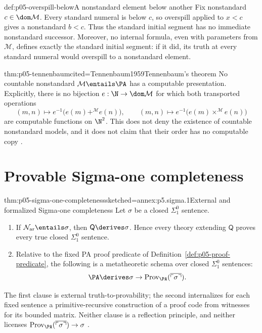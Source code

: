 \begin{hbexample}{def:p05-overspill-below}{A nonstandard element below another}
Fix nonstandard \(c\in\dom\mathcal M\).  Every standard numeral is below
\(c\), so overspill applied to \(x<c\) gives a nonstandard \(b<c\).
Thus the standard initial segment has no immediate nonstandard successor.
Moreover, no internal formula, even with parameters from \(\mathcal M\),
defines exactly the standard initial segment: if it did, its truth at every
standard numeral would overspill to a nonstandard element.
\end{hbexample}

\begin{hbtheorem}{thm:p05-tennenbaum}{cited=Tennenbaum1959}{Tennenbaum's theorem}
No countable nonstandard \(\mathcal M\entails\PA\) has a computable
presentation.  Explicitly, there is no bijection
\(e:\N\to\dom\mathcal M\) for which both transported operations
\[
  (m,n)\longmapsto e^{-1}\!\bigl(e(m)+^{\mathcal M}e(n)\bigr),\qquad
  (m,n)\longmapsto e^{-1}\!\bigl(e(m)\times^{\mathcal M}e(n)\bigr)
\]
are computable functions on \(\N^2\).  This does not deny the existence
of countable nonstandard models, and it does not claim that their order
has no computable copy \cite{Kaye1991}.
\end{hbtheorem}

\section{Provable Sigma-one completeness}

\begin{hbtheorem}{thm:p05-sigma-one-completeness}{sketched=annex:p5.sigma.1}{External and formalized Sigma-one completeness}
Let \(\sigma\) be a closed \(\Sigma^0_1\) sentence.
\begin{enumerate}
  \item If \(\mathcal N_{\mathrm{ar}}\entails\sigma\), then
        \(\mathsf Q\derives\sigma\).  Hence every theory extending
        \(\mathsf Q\) proves every true closed \(\Sigma^0_1\) sentence.
  \item Relative to the fixed PA proof predicate of
        Definition~\ref{def:p05-proof-predicate}, the following is a
        metatheoretic schema over closed \(\Sigma^0_1\) sentences:
        \[
          \PA\derives
          \sigma\to
          \mathrm{Prov}_{\PA}(\overline{\ulcorner\sigma\urcorner}).
        \]
\end{enumerate}
The first clause is external truth-to-provability; the second internalizes
for each fixed sentence a primitive-recursive construction of a proof code
from witnesses for its bounded matrix.  Neither clause is a reflection
principle, and neither licenses
\(\mathrm{Prov}_{\PA}(\overline{\ulcorner\sigma\urcorner})\to\sigma\)
\cite{Shoenfield1967,HilbertBernays1939}.
\end{hbtheorem}

